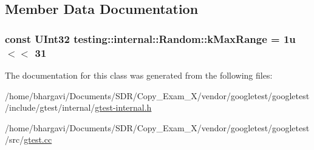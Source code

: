 \subsection{Member Data Documentation}
\subsubsection[{\texorpdfstring{k\+Max\+Range}{kMaxRange}}]{\setlength{\rightskip}{0pt plus 5cm}const {\bf U\+Int32} testing\+::internal\+::\+Random\+::k\+Max\+Range = 1u $<$$<$ 31\hspace{0.3cm}{\ttfamily [static]}}\hypertarget{classtesting_1_1internal_1_1_random_a36d72dd7063d0b5338f229e75382fdd2}{}\label{classtesting_1_1internal_1_1_random_a36d72dd7063d0b5338f229e75382fdd2}


The documentation for this class was generated from the following files\+:\begin{DoxyCompactItemize}
\item 
/home/bhargavi/\+Documents/\+S\+D\+R/\+Copy\+\_\+\+Exam\+\_\+X/vendor/googletest/googletest/include/gtest/internal/\hyperlink{gtest-internal_8h}{gtest-\/internal.\+h}\item 
/home/bhargavi/\+Documents/\+S\+D\+R/\+Copy\+\_\+\+Exam\+\_\+X/vendor/googletest/googletest/src/\hyperlink{gtest_8cc}{gtest.\+cc}\end{DoxyCompactItemize}
